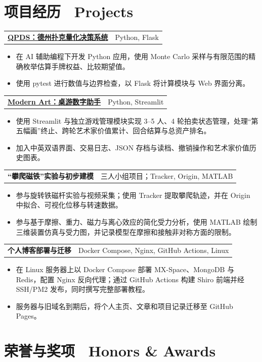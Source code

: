 \documentclass[10pt,a4paper]{article}
\makeatletter
\newcommand{\cventry}[2]{%
  \begin{tabularx}{\textwidth}{@{}Xr@{}}
    \textbf{#1} & #2
  \end{tabularx}
}
\makeatother
\begin{document}
\section*{项目经历 \textbar\ Projects}

\cventry{\href{https://github.com/APhysickui/QPDS}{QPDS：德州扑克量化决策系统}}{Python, Flask}
\begin{itemize}
  \item 在 AI 辅助编程下开发 Python 应用，使用 Monte Carlo 采样与有限范围的精确枚举估算手牌权益、比较期望值。
  \item 使用 pytest 进行数值与边界检查，以 Flask 将计算模块与 Web 界面分离。
\end{itemize}

\cventry{\href{https://github.com/APhysickui/Modern_Art}{Modern Art：桌游数字助手}}{Python, Streamlit}
\begin{itemize}
  \item 使用 Streamlit 与独立游戏管理模块实现 3--5 人、4 轮拍卖状态管理，处理“第五幅画”终止、跨轮艺术家价值累计、回合结算与总资产排名。
  \item 加入中英双语界面、交易日志、JSON 存档与读档、撤销操作和艺术家价值历史图表。
\end{itemize}

\cventry{“攀爬磁铁”实验与初步建模}{三人小组项目；Tracker, Origin, MATLAB}
\begin{itemize}
  \item 参与旋转铁磁杆实验与视频采集；使用 Tracker 提取攀爬轨迹，并在 Origin 中拟合、可视化位移与转速数据。
  \item 参与基于摩擦、重力、磁力与离心效应的简化受力分析，使用 MATLAB 绘制三维装置仿真与受力图，并记录模型在摩擦和接触非对称方面的限制。
\end{itemize}

\cventry{个人博客部署与迁移}{Docker Compose, Nginx, GitHub Actions, Linux}
\begin{itemize}
  \item 在 Linux 服务器上以 Docker Compose 部署 MX-Space、MongoDB 与 Redis，配置 Nginx 反向代理；通过 GitHub Actions 构建 Shiro 前端并经 SSH/PM2 发布，同时撰写完整部署教程。
  \item 服务器与旧域名到期后，将个人主页、文章和项目记录迁移至 GitHub Pages。
\end{itemize}

\section*{荣誉与奖项 \textbar\ Honors \& Awards}
\end{document}
